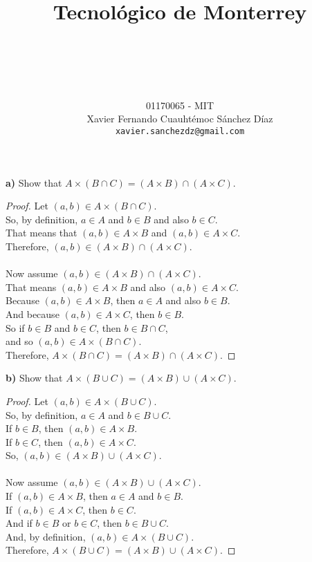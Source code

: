 \documentclass[titlepage, letterpaper, fleqn]{article}
\title{
\vspace{1in}
\textbf{Tecnológico de Monterrey} \\
\vspace{0.5in}
\textmd{\mahclass} \\
\large{\textit{\mahteacher}} \\
\vspace{0.5in}
\textsc{\mahtitle}
\author{01170065  - MIT \\
Xavier Fernando Cuauhtémoc Sánchez Díaz \\
\texttt{xavier.sanchezdz@gmail.com}}
\date{\mahdate}
}
\newcommand{\spacepls}{\vspace{5mm}}
\begin{document}
\begin{titlepage}
\maketitle
\end{titlepage}

%
%

{\large \textbf{a)} Show that \(A \times (B \cap C) = (A \times B) \cap (A \times C)\).}

\begin{proof}
	Let \((a,b) \in A \times (B \cap C)\).\\
	So, by definition, \(a \in A\) and \(b \in B\) and also \(b \in C\).\\
	That means that \((a,b) \in A \times B\) and \((a,b) \in A \times C\).\\
	Therefore, \((a,b) \in (A \times B) \cap (A \times C)\).\\
	\\
	Now assume \((a,b) \in (A \times B) \cap (A \times C)\).\\
	That means \((a,b) \in A \times B\) and also \((a,b) \in A \times C\).\\
	Because \((a,b) \in A \times B\), then \(a \in A\) and also \(b \in B\).\\
	And because \((a,b) \in A \times C\), then \(b \in B\).\\
	So if \(b \in B\) and \(b \in C\), then \(b \in B \cap C\),\\
	and so \((a,b) \in A \times (B \cap C)\).\\
	Therefore, \(A \times (B \cap C) = (A \times B) \cap (A \times C)\).
\end{proof}

\spacepls

{\large \textbf{b)} Show that \(A \times (B \cup C) = (A \times B) \cup (A \times C)\).}

\begin{proof}
	Let \((a,b) \in A \times (B \cup C)\).\\
	So, by definition, \(a \in A\) and \(b \in B \cup C\).\\
	If \(b \in B\), then \((a,b) \in A \times B\).\\
	If \(b \in C\), then \((a,b) \in A \times C\).\\
	So, \((a,b) \in (A \times B) \cup (A \times C)\).\\
	\\
	Now assume \((a,b) \in (A \times B) \cup (A \times C)\).\\
	If \((a,b) \in A \times B\), then \(a \in A\) and \(b \in B\).\\
	If \((a,b) \in A \times C\), then \(b \in C\).\\
	And if \(b \in B\) or \(b \in C\), then \(b \in B \cup C\).\\
	And, by definition, \((a,b) \in A \times (B \cup C)\).\\
	Therefore, \(A \times (B \cup C) = (A \times B) \cup (A \times C)\).
\end{proof}
\end{document}

